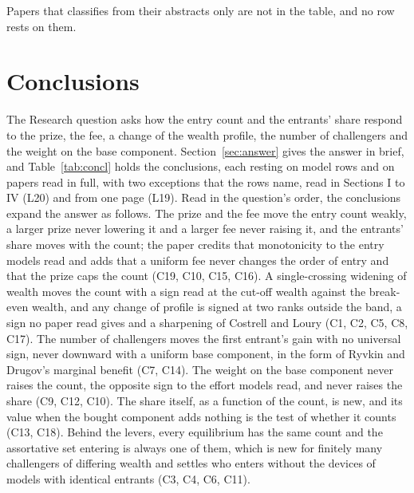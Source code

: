\normalsize

Papers that  classifies from their abstracts only are not
in the table, and no row rests on them.

\section{Conclusions}

The Research question asks how the entry count and the entrants' share
respond to the prize, the fee, a change of the wealth profile, the number of
challengers and the weight on the base component. Section~\ref{sec:answer} gives the
answer in brief, and Table~\ref{tab:concl} holds the conclusions, each resting
on model rows and on papers read in full, with two exceptions that the rows
name, \citet{MorganTumlinsonVardy2022} read in Sections I to IV (L20) and
\citet{Tilly1998} from one page (L19). Read in the question's order, the
conclusions expand the answer as follows. The prize and the fee move the entry
count weakly, a larger prize never lowering it and a larger fee never raising
it, and the entrants' share moves with the count; the paper credits that
monotonicity to the entry models read and adds that a uniform fee never
changes the order of entry and that the prize caps the count (C19, C10, C15,
C16). A single-crossing widening of wealth moves the count with a sign read at
the cut-off wealth against the break-even wealth, and any change of profile is
signed at two
ranks outside the band, a sign no paper read gives and a sharpening of
Costrell and Loury (C1, C2, C5, C8, C17). The number of challengers moves the
first entrant's gain with no universal sign, never downward with a uniform
base component, in the form of Ryvkin and Drugov's marginal benefit (C7,
C14). The weight on the base component never raises the count, the opposite
sign to the effort models read, and never raises the share (C9, C12, C10). The
share itself, as a function of the count, is new, and its value when the
bought component adds nothing is the test of whether it counts (C13, C18).
Behind the levers, every equilibrium has the same count and the assortative
set entering is always one of them, which is new for finitely many challengers
of differing wealth and settles who enters without the devices of models with
identical entrants (C3, C4, C6, C11).


